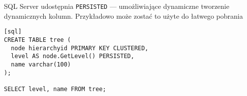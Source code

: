 
SQL Server udostępnia \texttt{PERSISTED} --- umożliwiające dynamiczne tworzenie dynamicznych kolumn. 
Przykładowo może zostać to użyte do łatwego pobrania 

\begin{verbatim}[sql]
CREATE TABLE tree (
  node hierarchyid PRIMARY KEY CLUSTERED,
  level AS node.GetLevel() PERSISTED,
  name varchar(100)
);

SELECT level, name FROM tree;
\end{verbatim}















